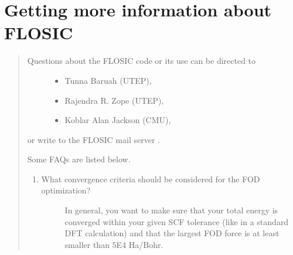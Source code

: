 \documentclass[letterpaper,10pt,english,openany,oneside]{sphinxmanual}
\begin{document}
\chapter{Getting more information about FLOSIC}
\label{\detokenize{docs/nrlmolfaq:getting-more-information-about-flosic}}\label{\detokenize{docs/nrlmolfaq:nrlmolfaq}}\label{\detokenize{docs/nrlmolfaq::doc}}\begin{quote}
\begin{description}
\item[{Questions about the FLOSIC code or its use can be directed to}] \leavevmode\begin{itemize}
\item {} 
\sphinxAtStartPar
Tunna Baruah        (UTEP), 

\item {} 
\sphinxAtStartPar
Rajendra R. Zope    (UTEP), 

\item {} 
\sphinxAtStartPar
Koblar Alan Jackson (CMU), 

\end{itemize}

\end{description}

\sphinxAtStartPar
or write to the FLOSIC mail server .

\sphinxAtStartPar
Some FAQs are listed below.
\begin{enumerate}
%
\item {} \begin{description}
\item[{What convergence criteria should be considered for the FOD optimization?}] \leavevmode
\sphinxAtStartPar
In general, you want to make sure that your total energy is converged within your given SCF tolerance (like in a standard DFT calculation) and
that the largest FOD force is at least smaller than 5E\sphinxhyphen{}4 Ha/Bohr.

\end{description}


\end{enumerate}
\end{quote}
\end{document}
